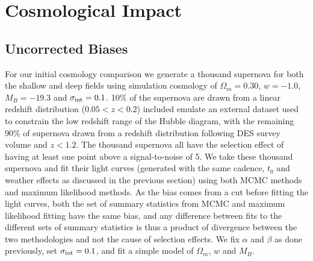 \documentclass[a4paper,fleqn,usenatbib]{mnras}
\begin{document}
\section{Cosmological Impact}
\label{sec:cosmology}

\subsection{Uncorrected Biases}
For our initial cosmology comparison we generate a thousand supernova for both the shallow and deep fields using simulation cosmology of $\Omega_m = 0.30$, $w = -1.0$, $M_B = -19.3$ and $\sigma_{\rm int} = 0.1$. 10\% of the supernova are drawn from a linear redshift distribution ($0.05 < z < 0.2$) included emulate an external dataset used to constrain the low redshift range of the Hubble diagram, with the remaining 90\% of supernova drawn from a redshift distribution following DES survey volume and $z < 1.2$. The thousand supernova all have the selection effect of having at least one point above a signal-to-noise of 5. We take these thousand supernova and fit their light curves (generated with the same cadence, $t_0$ and weather effects as discussed in the previous section) using both MCMC methods and maximum likelihood methods. As the bias comes from a cut before fitting the light curves, both the set of summary statistics from MCMC and maximum likelihood fitting have the same bias, and any difference between fits to the different sets of summary statistics is thus a product of divergence between the two methodologies and not the cause of selection effects.  We fix $\alpha$ and $\beta$ as done previously, set $\sigma_{\rm int} = 0.1$, and fit a simple model of $\Omega_m$, $w$ and $M_B$.
\end{document}
